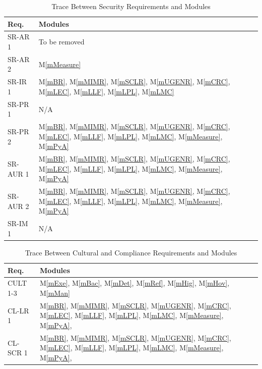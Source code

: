 \documentclass[12pt, titlepage]{article}
\newcommand{\mref}[1]{M\ref{#1}}
\begin{document}
\begin{table}[H]
  \centering
  \begin{tabular}{p{} p{}}
    \toprule \textbf{Req.} & \textbf{Modules}\\
    \midrule
    SR-AR 1 & To be removed\\
    SR-AR 2 & \mref{mMeasure}\\
    SR-IR 1 & \mref{mBR}, \mref{mMIMR}, \mref{mSCLR}, \mref{mUGENR}, \mref{mCRC}, \mref{mLEC}, \mref{mLLF}, \mref{mLPL}, \mref{mLMC}\\
    SR-PR 1 & N/A\\
    SR-PR 2 & \mref{mBR}, \mref{mMIMR}, \mref{mSCLR}, \mref{mUGENR}, \mref{mCRC}, \mref{mLEC}, \mref{mLLF}, \mref{mLPL}, \mref{mLMC}, \mref{mMeasure}, \mref{mPyA}\\
    SR-AUR 1 & \mref{mBR}, \mref{mMIMR}, \mref{mSCLR}, \mref{mUGENR}, \mref{mCRC}, \mref{mLEC}, \mref{mLLF}, \mref{mLPL}, \mref{mLMC}, \mref{mMeasure}, \mref{mPyA}\\
    SR-AUR 2 & \mref{mBR}, \mref{mMIMR}, \mref{mSCLR}, \mref{mUGENR}, \mref{mCRC}, \mref{mLEC}, \mref{mLLF}, \mref{mLPL}, \mref{mLMC}, \mref{mMeasure}, \mref{mPyA}\\
    SR-IM 1 & N/A\\
    \bottomrule
  \end{tabular}
  \caption{Trace Between Security Requirements and Modules}
  \label{tab:SR-mod}
\end{table}

\begin{table}[H]
  \centering
  \begin{tabular}{p{} p{}}
    \toprule \textbf{Req.} & \textbf{Modules}\\
    \midrule
    CULT 1-3 & \mref{mExe}, \mref{mBac}, \mref{mDet}, \mref{mRef}, \mref{mHig}, \mref{mHov}, \mref{mMan}\\
    CL-LR 1 & \mref{mBR}, \mref{mMIMR}, \mref{mSCLR}, \mref{mUGENR}, \mref{mCRC}, \mref{mLEC}, \mref{mLLF}, \mref{mLPL}, \mref{mLMC}, \mref{mMeasure}, \mref{mPyA}, \\
    CL-SCR 1 & \mref{mBR}, \mref{mMIMR}, \mref{mSCLR}, \mref{mUGENR}, \mref{mCRC}, \mref{mLEC}, \mref{mLLF}, \mref{mLPL}, \mref{mLMC}, \mref{mMeasure}, \mref{mPyA}, \\ 
    \bottomrule
  \end{tabular}
  \caption{Trace Between Cultural and Compliance Requirements and Modules}
  \label{tab:CUL-COMP-mod}
\end{table}
\end{document}
